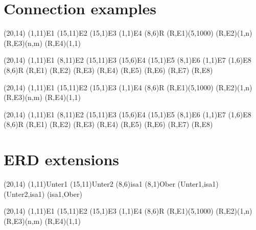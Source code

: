 \documentclass[a4paper,11pt]{article}
\begin{document}
\section{Connection examples}

\begin{schema}(20,14)
  \entity(1,11){E1}
  \entity(15,11){E2}
  \entity(15,1){E3}
  \entity(1,1){E4}
  \relation(8,6){R}
  \connection(R,E1){(5,1000)}
  \connection(R,E2){(1,n)}
  \connection(R,E3){(n,m)}
  \connection(R,E4){(1,1)}
\end{schema}

\begin{schema}(20,14)
  \entity(1,11){E1}
  \entity(8,11){E2}
  \entity(15,11){E3}
  \entity(15,6){E4}
  \entity(15,1){E5}
  \entity(8,1){E6}
  \entity(1,1){E7}
  \entity(1,6){E8}
  \relation(8,6){R}
  \connection(R,E1){}
  \connection(R,E2){}
  \connection(R,E3){}
  \connection(R,E4){}
  \connection(R,E5){}
  \connection(R,E6){}
  \connection(R,E7){}
  \connection(R,E8){}
\end{schema}

\begin{schema}(20,14)
  \entity(1,11){E1}
  \entity(15,11){E2}
  \entity(15,1){E3}
  \entity(1,1){E4}
  \relation(8,6){R}
  \conn(R,E1){(5,1000)}
  \conn(R,E2){(1,n)}
  \conn(R,E3){(n,m)}
  \conn(R,E4){(1,1)}
\end{schema}

\begin{schema}(20,14)
  \entity(1,11){E1}
  \entity(8,11){E2}
  \entity(15,11){E3}
  \entity(15,6){E4}
  \entity(15,1){E5}
  \entity(8,1){E6}
  \entity(1,1){E7}
  \entity(1,6){E8}
  \relation(8,6){R}
  \conn(R,E1){}
  \conn(R,E2){}
  \conn(R,E3){}
  \conn(R,E4){}
  \conn(R,E5){}
  \conn(R,E6){}
  \conn(R,E7){}
  \conn(R,E8){}
\end{schema}

\section{ERD extensions}

\begin{schema}(20,14)
  \entity(1,11){Unter1}
  \entity(15,11){Unter2}
  \isa(8,6){isa1}
  \entity(8,1){Ober}
  \conn(Unter1,isa1){}
  \conn(Unter2,isa1){}
  \conn(isa1,Ober){}
\end{schema}

\begin{schema}(20,14)
  \wentity(1,11){E1}
  \entity(15,11){E2}
  \entity(15,1){E3}
  \entity(1,1){E4}
  \wrelation(8,6){R}
  \conn(R,E1){(5,1000)}
  \conn(R,E2){(1,n)}
  \conn(R,E3){(n,m)}
  \conn(R,E4){(1,1)}
\end{schema}
\end{document}
